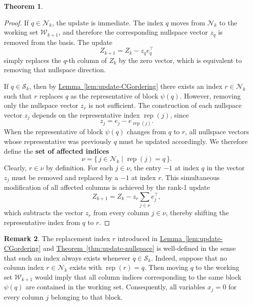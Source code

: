 \documentclass{book}
\theoremstyle{definition}
\newtheorem{theorem}{Theorem}[section]
\newtheorem{remark}[theorem]{Remark}
\newcommand{\thref}[1]{\hyperref[#1]{Theorem~\ref*{#1}}}
\newcommand{\lemref}[1]{\hyperref[#1]{Lemma~\ref*{#1}}}
\numberwithin{algorithm_}{chapter}
\begin{document}
{\begin{theorem}
\begin{proof}
If \(q \in \mathcal{N}_k\), the update is immediate.  
The index \(q\) moves from \(\mathcal{N}_k\) to the working set \(\mathcal{W}_{k+1}\), and therefore the corresponding nullspace vector \(z_q\) is removed from the basis.  
The update
\[
Z_{k+1} = Z_k - z_q e_q^\top
\]
simply replaces the \(q\)-th column of \(Z_k\) by the zero vector, which is equivalent to removing that nullspace direction.

If \(q \in \mathcal{S}_k\), then by \lemref{lem:update-CGordering} there exists an index \(r \in \mathcal{N}_k\) such that \(r\) replaces \(q\) as the representative of block \(\psi(q)\).
However, removing only the nullspace vector \(z_r\) is not sufficient.  
The construction of each nullspace vector \(z_j\) depends on the representative index \(\operatorname{rep}(j)\), since
\[
z_j = e_j - e_{\operatorname{rep}(j)}.
\]
When the representative of block \(\psi(q)\) changes from \(q\) to \(r\), all nullspace vectors whose representative was previously \(q\) must be updated accordingly.  
We therefore define the \textbf{set of affected indices}
\begin{equation} \label{eq:set_affected}
\nu
=
\{\, j \in \mathcal{N}_k \mid \operatorname{rep}(j) = q \,\}.
\end{equation}
Clearly, \(r \in \nu\) by definition. For each \(j \in \nu\), the entry \(-1\) at index \(q\) in the vector \(z_j\) must be removed and replaced by a \(-1\) at index \(r\).  
This simultaneous modification of all affected columns is achieved by the rank-1 update
\[
Z_{k+1}
=
Z_k
-
z_r
\sum_{j \in \nu} e_j^\top,
\]
which subtracts the vector \(z_r\) from every column \(j \in \nu\), thereby shifting the representative index from \(q\) to \(r\).

\end{proof}
\end{theorem}


\begin{remark}
The replacement index \(r\) introduced in \lemref{lem:update-CGordering} and \thref{thm:update-nullspace} is well-defined in the sense that such an index always exists whenever \(q \in \mathcal{S}_k\). Indeed, suppose that no column index \(r \in \mathcal{N}_k\) exists with 
\(\operatorname{rep}(r) = q\).  
Then moving \(q\) to the working set \(\mathcal{W}_{k+1}\) would imply that all column indices corresponding to the same block \(\psi(q)\) are contained in the working set. Consequently, all variables \(x_j = 0\) for every column \(j\) belonging to that block.


\end{remark}}
\end{document}
